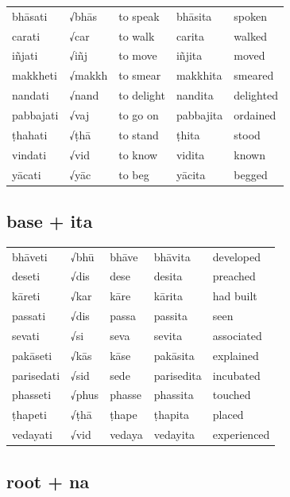 \documentclass[11pt,oneside]{memoir}
\begin{document}
\begin{center}
\begin{tabular}{lllll}
bhāsati & √bhās & to speak & bhāsita & spoken\\
carati & √car & to walk & carita & walked\\
iñjati & √iñj & to move & iñjita & moved\\
makkheti & √makkh & to smear & makkhita & smeared\\
nandati & √nand & to delight & nandita & delighted\\
pabbajati & √vaj & to go on & pabbajita & ordained\\
ṭhahati & √ṭhā & to stand & ṭhita & stood\\
vindati & √vid & to know & vidita & known\\
yācati & √yāc & to beg & yācita & begged\\
\end{tabular}
\end{center}
\subsection{base + ita}
\label{sec:org8d9ebf1}

\begin{center}
\begin{tabular}{lllll}
bhāveti & √bhū & bhāve & bhāvita & developed\\
deseti & √dis & dese & desita & preached\\
kāreti & √kar & kāre & kārita & had built\\
passati & √dis & passa & passita & seen\\
sevati & √si & seva & sevita & associated\\
pakāseti & √kās & kāse & pakāsita & explained\\
parisedati & √sid & sede & parisedita & incubated\\
phasseti & √phus & phasse & phassita & touched\\
ṭhapeti & √ṭhā & ṭhape & ṭhapita & placed\\
vedayati & √vid & vedaya & vedayita & experienced\\
\end{tabular}
\end{center}
\subsection{root + na}
\label{sec:orgb836275}
\end{document}
